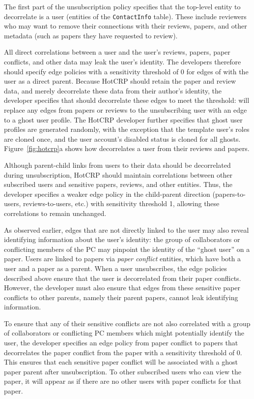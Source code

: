The first part of the unsubscription policy specifies that the top-level entity to decorrelate is a
user (entities of the \texttt{ContactInfo} table). These include reviewers who may want to remove
their connections with their reviews, papers, and other metadata (such as papers they have requested
to review).

All direct correlations between a user and the user's reviews, papers, paper conflicts, and other
data may leak the user's identity. The developers therefore should specify edge policies with a sensitivity
threshold of 0 for edges of with the user as a direct parent. 
Because HotCRP should retain the paper and review data, and merely decorrelate these data from their
author's identity, the developer specifies that \sys should decorrelate these edges to meet the
threshold: \sys will replace any edges from papers or reviews to the unsubscribing user with an edge
to a ghost user profile. The HotCRP developer further specifies that ghost user profiles are
generated randomly, with the exception that the template user's roles are cloned once, and the user
account's disabled status is cloned for all ghosts.
Figure~\ref{fig:hotcrp}a shows how \sys decorrelates a user from their reviews and papers.

Although parent-child links from users to their data should be decorrelated during unsubscription,
HotCRP should maintain correlations between other subscribed users and sensitive papers, reviews,
and other entities. Thus, the developer specifies a weaker edge policy in the child-parent
direction (papers-to-users, reviews-to-users, etc.) with sensitivity threshold 1, allowing these
correlations to remain unchanged.

As observed earlier, edges that are not directly linked to the user may also reveal identifying
information about the user's identity: the group of collaborators or conflicting members of the PC
may pinpoint the identity of the ``ghost user'' on a paper. Users are linked to papers via
\emph{paper conflict} entities, which have both a user and a paper as a parent. 
When a user unsubscribes, the edge policies described above ensure that the user is decorrelated from
their paper conflicts. However, the developer must also ensure that edges from these sensitive paper
conflicts to other parents, namely their parent papers, cannot leak identifying information.

To ensure that any of their sensitive conflicts are not also correlated with a group of
collaborators or conflicting PC members which might potentially identify the user, the developer
specifies an edge policy from paper conflict to papers that decorrelates the paper conflict from the
paper with a sensitivity threshold of 0.  This ensures that each sensitive paper conflict will be
associated with a ghost paper parent after unsubscription.  To other subscribed users who can view
the paper, it will appear as if there are no other users with paper conflicts for that paper.

